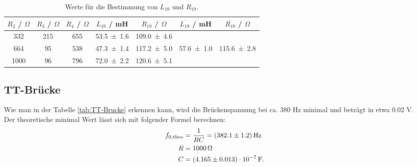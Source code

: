 \begin{table}[H] %
  \centering
  \begin{tabular}{c c c c c c c}
    \toprule
    $R_2$ / $\Omega$ & $R_3$ / $\Omega$ & $R_4$ / $\Omega$ & $L_{19}$ / mH & $R_{19}$ / $\Omega$ & $\overline{L_{19}}$ / mH & $\overline{R_{19}}$ / $\Omega$ \\
    \midrule
    332 & 215 & 655 & \num{53.5 +- 1.6} & \num{109.0 +- 4.6} & & \\
    664 & 95 & 538 & \num{47.3 +- 1.4} & \num{117.2 +- 5.0} & \num{57.6 +- 1.0} & \num{115.6 +- 2.8} \\
    1000 & 96 & 796 & \num{72.0 +- 2.2} & \num{120.6 +- 5.1} & & \\
  \end{tabular}
  \caption{Werte für die Bestimmung von $L_{19}$ und $R_{19}$.}
  \label{tab:Induk2}
\end{table}

\newpage
\subsection{TT-Brücke}
Wie man in der Tabelle \ref{tab:TT-Brucke} erkennen kann, wird die Brückenspannung bei ca. 380 Hz minimal und beträgt in etwa 0.02 V. \\
Der theoretische minimal Wert lässt sich mit folgender Formel berechnen:
\begin{align*}
  f_{0,\text{theo}} & = \frac{1}{RC} = (\num{382.1 +- 1.2}) \, \text{Hz} \\
  R & = 1000 \, \Omega \\
  C & = (\num{4.165 +- 0.013}) \cdot 10^{-7} \, \text{F}.
\end{align*}

